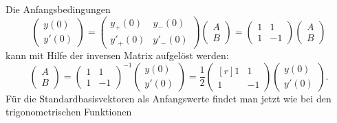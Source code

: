 Die Anfangsbedingungen 
%
\[
\begin{pmatrix}
 y(0)\\
y'(0)
\end{pmatrix}
=
\begin{pmatrix}
 y_+(0) &  y_-(0) \\
y'_+(0) & y'_-(0) 
\end{pmatrix}
\begin{pmatrix}
A\\B
\end{pmatrix}
=
\begin{pmatrix}
  1     &    1    \\
  1     &   -1
\end{pmatrix}
\begin{pmatrix}
A\\B
\end{pmatrix}
\]
kann mit Hilfe der inversen Matrix aufgelöst werden:
\[
\begin{pmatrix}
A\\B
\end{pmatrix}
=
\begin{pmatrix}
  1     &    1    \\
  1     &   -1
\end{pmatrix}^{-1}
\begin{pmatrix}
 y(0)\\
y'(0)
\end{pmatrix}
=
\frac12
\begin{pmatrix*}[r]
1&1\\
1&-1
\end{pmatrix*}
\begin{pmatrix}
 y(0)\\
y'(0)
\end{pmatrix}.
\]
Für die Standardbasisvektoren als Anfangswerte findet man jetzt wie bei
den trigonometrischen Funktionen 
